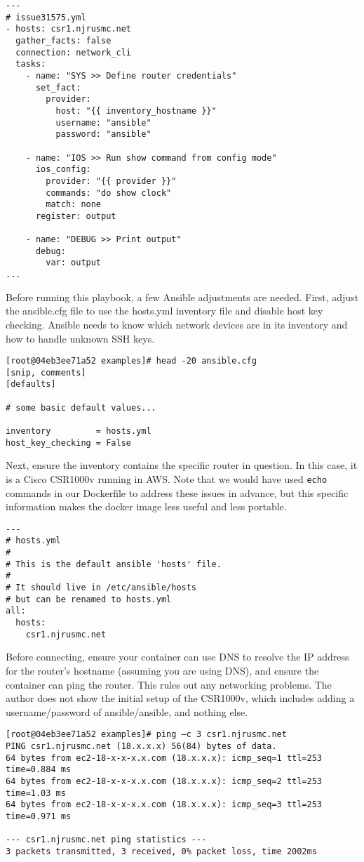 \begin{verbatim}
---
# issue31575.yml
- hosts: csr1.njrusmc.net
  gather_facts: false
  connection: network_cli
  tasks:
    - name: "SYS >> Define router credentials"
      set_fact:
        provider:
          host: "{{ inventory_hostname }}" 
          username: "ansible"
          password: "ansible"

    - name: "IOS >> Run show command from config mode" 
      ios_config:
        provider: "{{ provider }}"
        commands: "do show clock"
        match: none
      register: output

    - name: "DEBUG >> Print output"
      debug:
        var: output
...
\end{verbatim}

Before running this playbook, a few Ansible adjustments are needed. First,
adjust the ansible.cfg file to use the hosts.yml inventory file and disable
host key checking. Ansible needs to know which network devices are in its
inventory and how to handle unknown SSH keys.

\begin{verbatim}
[root@04eb3ee71a52 examples]# head -20 ansible.cfg 
[snip, comments]
[defaults]

# some basic default values...

inventory         = hosts.yml
host_key_checking = False
\end{verbatim}

Next, ensure the inventory contains the specific router in question. In this
case, it is a Cisco CSR1000v running in AWS\@. Note that we would have used
\verb|echo| commands in our Dockerfile to address these issues in advance, but
this specific information makes the docker image less useful and less portable.

\begin{verbatim}
---
# hosts.yml
#
# This is the default ansible 'hosts' file.
#
# It should live in /etc/ansible/hosts
# but can be renamed to hosts.yml
all:
  hosts:
    csr1.njrusmc.net
\end{verbatim}

Before connecting, ensure your container can use DNS to resolve the IP address
for the router's hostname (assuming you are using DNS), and ensure the
container can ping the router. This rules out any networking problems. The
author does not show the initial setup of the CSR1000v, which includes adding
a username/password of ansible/ansible, and nothing else.

\begin{verbatim}
[root@04eb3ee71a52 examples]# ping –c 3 csr1.njrusmc.net
PING csr1.njrusmc.net (18.x.x.x) 56(84) bytes of data.
64 bytes from ec2-18-x-x-x.x.com (18.x.x.x): icmp_seq=1 ttl=253 time=0.884 ms
64 bytes from ec2-18-x-x-x.x.com (18.x.x.x): icmp_seq=2 ttl=253 time=1.03 ms
64 bytes from ec2-18-x-x-x.x.com (18.x.x.x): icmp_seq=3 ttl=253 time=0.971 ms

--- csr1.njrusmc.net ping statistics ---
3 packets transmitted, 3 received, 0% packet loss, time 2002ms
\end{verbatim}

